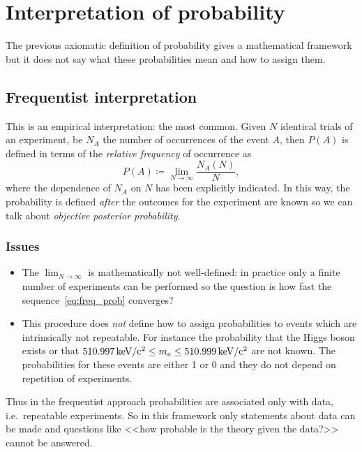 \section{Interpretation of probability}

The previous axiomatic definition of probability gives a mathematical framework but it does not say what these probabilities mean and how to assign them.

\subsection{Frequentist interpretation}

This is an empirical interpretation: the most common.
Given $N$ identical trials of an experiment, be $N_A$ the number of occurrences of the event $A$, then $P(A)$ is defined in terms of the \emph{relative frequency} of occurrence as
\begin{equation}\label{eq:freq_prob}
	P(A)\coloneqq \lim_{N\to\infty}\frac{N_A(N)}{N},
\end{equation}
where the dependence of $N_A$ on $N$ has been explicitly indicated.
In this way, the probability is defined \emph{after} the outcomes for the experiment are known so we can talk about \emph{objective posterior probability}.

\subsubsection{Issues}

\begin{itemize}
	\item
		The $\lim_{N\to\infty}$ is mathematically not well-defined: in practice only a finite number of experiments can be performed so the question is how fast the sequence~\eqref{eq:freq_prob} converges?
	\item
		This procedure does \emph{not} define how to assign probabilities to events which are intrinsically not repeatable.
		For instance the probability that the Higgs boson exists or that $\SI{510.997}{\kilo\electronvolt\per \ensuremath{c}\squared}\le m_e \le\SI{510.999}{\kilo\electronvolt\per \ensuremath{c}\squared}$ are not known.
		The probabilities for these events are either \num{1} or \num{0} and they do not depend on  repetition of experiments.
\end{itemize}

Thus in the frequentist approach probabilities are associated only with data, i.e.~repeatable experiments.
So in this framework only statements about data can be made and questions like <<how probable is the theory given the data?>> cannot be answered.


